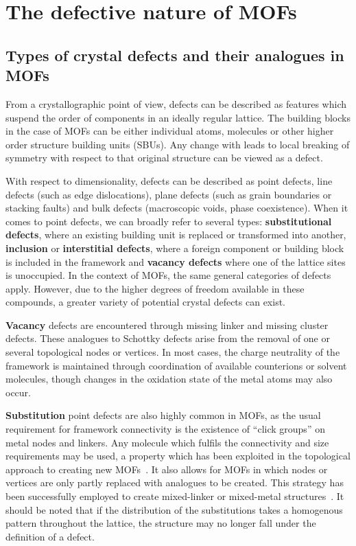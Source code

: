 
\section{The defective nature of MOFs}

\subsection{Types of crystal defects and their analogues in MOFs}

From a crystallographic point of view, defects can be described
as features which suspend the order of components in an ideally
regular lattice. The building blocks in the case of MOFs can be either
individual atoms, molecules or other higher order structure building
units (SBUs). Any change with leads to local breaking of symmetry with
respect to that original structure can be viewed as a defect.

With respect to dimensionality, defects can be described
as point defects, line defects (such as edge dislocations),
plane defects (such as grain boundaries or stacking faults) and bulk
defects (macroscopic voids, phase coexistence).
When it comes to point defects, we can broadly refer to several types:
\textbf{substitutional defects}, where an existing building unit is
replaced or transformed into another, \textbf{inclusion} or
\textbf{interstitial defects}, where a foreign component
or building block is included in the framework and \textbf{vacancy defects}
where one of the lattice sites is unoccupied.
In the context of MOFs, the same general categories of defects
apply. However, due to the higher degrees of freedom available in
these compounds, a greater variety of potential crystal defects
can exist.

\textbf{Vacancy} defects are encountered through missing linker and
missing cluster defects. These analogues to Schottky defects
arise from the removal of one or several topological nodes or vertices.
In most cases, the charge neutrality of the framework
is maintained through coordination of available counterions or solvent
molecules, though changes in the oxidation state of the metal atoms
may also occur.

\textbf{Substitution} point defects are also highly common in MOFs, as the
usual requirement for framework connectivity is the existence
of ``click groups'' on metal nodes and linkers. Any
molecule which fulfils the connectivity and size requirements may
be used, a property which has been exploited in the topological
approach to creating new 
MOFs~\cite{burnettRecentAdvancesPorphyrinic2012,%
    liTopologicalAnalysisMetal2014,%
    stockSynthesisMetalOrganicFrameworks2012}.
It also allows for MOFs in which nodes or vertices are only partly
replaced with analogues to be created. This strategy has been
successfully employed to create mixed-linker or mixed-metal 
structures~\cite{buekenTacklingDefectConundrum2017,%
	dhakshinamoorthyMixedmetalMixedlinkerMetal2016}.
It should be noted that if the distribution of the substitutions takes
a homogenous pattern throughout the lattice, the structure may no
longer fall under the definition of a defect.

